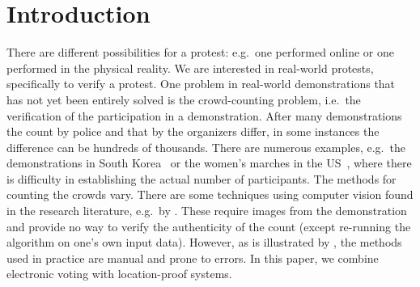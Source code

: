 \mode*

\section{Introduction}
\label{Introduction}

There are different possibilities for a protest: e.g.\ one performed online or 
one performed in the physical reality.
We are interested in real-world protests, specifically to verify a protest.
One problem in real-world demonstrations that has not yet been entirely solved 
is the crowd-counting problem, i.e.\ the verification of the participation in 
a demonstration.
After many demonstrations the count by police and that by the organizers 
differ, in some instances the difference can be hundreds of thousands.
There are numerous examples, e.g.\ the demonstrations in South 
Korea~\cite{2016DemonstrationsInSeoul} or the women's marches in the 
US~\cite{2017WomensMarchesInUS}, where there is difficulty in establishing the 
actual number of participants.
The methods for counting the crowds vary.
There are some techniques using computer vision found in the research 
literature, e.g.\ by \textcite{CVCrowdCounting}.
These require images from the demonstration and provide no way to verify the 
authenticity of the count (except re-running the algorithm on one's own input 
data).
However, as is illustrated by 
\textcite{2016DemonstrationsInSeoul,2017WomensMarchesInUS}, the methods used in 
practice are manual and prone to errors.
In this paper, we combine electronic voting with location-proof systems.

